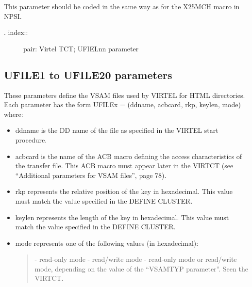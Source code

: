 \documentclass[letterpaper,10pt,english]{sphinxmanual}
\begin{document}
This parameter should be coded in the same way as for the X25MCH macro in NPSI.
\begin{description}
\item[{. index::}] \leavevmode
pair: Virtel TCT; UFIELnn parameter

\end{description}


\subsection{UFILE1 to UFILE20 parameters}
\label{\detokenize{Installation_Guide:ufile1-to-ufile20-parameters}}
\begin{sphinxVerbatim}[commandchars=\\\{\}]
 
\end{sphinxVerbatim}

These parameters define the VSAM files used by VIRTEL for HTML directories. Each parameter has the form UFILEx = (ddname, acbcard, rkp, keylen, mode) where:
\begin{itemize}
\item {} 
ddname is the DD name of the file as specified in the VIRTEL start procedure.

\item {} 
acbcard is the name of the ACB macro defining the access characteristics of the transfer file. This ACB macro must appear later in the VIRTCT (see “Additional parameters for VSAM files”, page 78).

\item {} 
rkp represents the relative position of the key in hexadecimal. This value must match the value specified in the DEFINE CLUSTER.

\item {} 
keylen represents the length of the key in hexadecimal. This value must match the value specified in the DEFINE CLUSTER.

\item {} 
mode represents one of the following values (in hexadecimal):
\begin{quote}

 - read-only mode
 - read/write mode
 - read-only mode or read/write mode, depending on the value of the “VSAMTYP parameter”. Seen the VIRTCT.
\end{quote}

\end{itemize}
\end{document}
